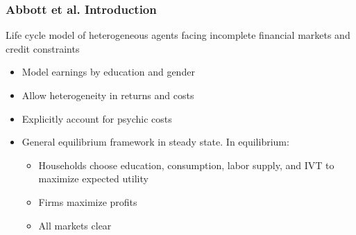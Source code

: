 \documentclass{beamer}
\begin{document}


\begin{frame}
\frametitle{Abbott et al. Introduction}
Life cycle model of heterogeneous agents facing incomplete financial markets and credit constraints
\begin{itemize}
\item Model earnings by education and gender
\item Allow heterogeneity in returns and costs
\item Explicitly account for psychic costs
\item General equilibrium framework in steady state. In equilibrium:
\begin{itemize}
\item Households choose education, consumption, labor supply, and IVT to maximize expected utility
\item Firms maximize profits
\item All markets clear 
\end{itemize}
\end{itemize}
\end{frame}
\end{document}
